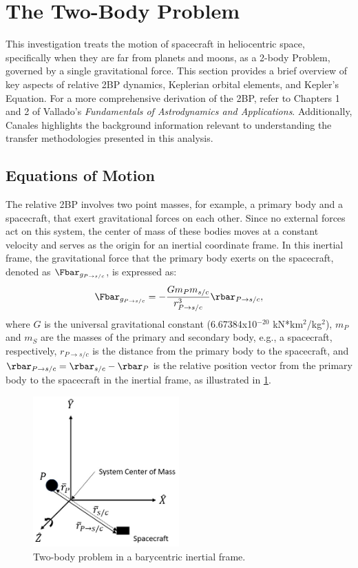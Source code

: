 \section{The Two-Body Problem}
This investigation treats the motion of spacecraft in heliocentric space, specifically when they
are far from planets and moons, as a 2-body Problem, governed by a single gravitational force. This
section provides a brief overview of key aspects of relative 2BP dynamics, Keplerian orbital
elements, and Kepler's Equation. For a more comprehensive derivation of the 2BP, refer to Chapters
1 and 2 of Vallado's \emph{Fundamentals of Astrodynamics and Applications}\cite{Vallado:2013}.
Additionally, Canales highlights the background information relevant to understanding the transfer
methodologies presented in this analysis\cite{Canales:2021b}.

\subsection{Equations of Motion}
The relative 2BP involves two point masses, for example, a primary body and a spacecraft, that
exert gravitational forces on each other. Since no external forces act on this system, the center
of mass of these bodies moves at a constant velocity and serves as the origin for an inertial
coordinate frame. In this inertial frame, the gravitational force that the primary body exerts on
the spacecraft, denoted as $\Fbar_{g_{P\rightarrow s/c}}$, is expressed as:
\begin{equation}
    \Fbar_{g_{P\rightarrow s/c}}=-\frac{Gm_{P}m_{s/c}}{r_{P\rightarrow s/c}^{3}}\rbar_{P\rightarrow s/c},
    \label{eq:gravity}
\end{equation}
where $G$ is the universal gravitational constant (6.67384x10$^{-20}$ kN*km$^{2}$/kg$^{2}$),
$m_{P}$ and $m_{S}$ are the masses of the primary and secondary body, e.g., a spacecraft,
respectively, $r_{P\rightarrow s/c}$ is the distance from the primary body to the spacecraft, and
$\rbar_{P\rightarrow s/c}=\rbar_{s/c}-\rbar_{P}$ is the relative position vector from the primary
body to the spacecraft in the inertial frame, as illustrated in \cref{fig:2BP}.

\begin{figure}[ht]
    \centering
    \includegraphics[width=0.5\textwidth]{figures/TBP.jpg}
    \caption{Two-body problem in a barycentric inertial frame.}
    \label{fig:2BP}
\end{figure}

